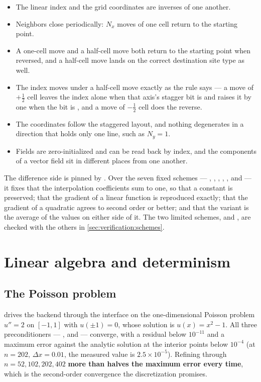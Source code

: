 \begin{itemize}
  \item The linear index and the grid coordinates are inverses of one another.
  \item Neighbors close periodically: $N_x$ moves of one cell return to the
    starting point.
  \item A one-cell move and a half-cell move both return to the starting point
    when reversed, and a half-cell move lands on the correct destination site
    type as well.
  \item The index moves under a half-cell move exactly as the rule says ---
    a move of $+\tfrac12$ cell leaves the index alone when that axis's stagger
    bit is  and raises it by one when the bit is , and a move of
    $-\tfrac12$ cell does the reverse.
  \item The coordinates follow the staggered layout, and nothing degenerates in
    a direction that holds only one line, such as $N_y = 1$.
  \item Fields are zero-initialized and can be read back by index, and the
    components of a vector field sit in different places from one another.
\end{itemize}

The difference side is pinned by . Over the
seven fixed schemes --- , , ,
, ,  and  --- it fixes
that the interpolation coefficients sum to one, so that a constant is
preserved; that the gradient of a linear function is reproduced exactly; that
the gradient of a quadratic agrees to second order or better; and that the
 variant is the average of the  values on either side of
it. The two limited schemes,  and , are checked with the others in \cref{sec:verification:schemes}.

\section{Linear algebra and determinism}
\label{sec:verification:linalg}

\subsection{The Poisson problem}

 drives the  backend through the
 interface on the one-dimensional Poisson problem
$u'' = 2$ on $[-1, 1]$ with $u(\pm1) = 0$, whose solution is
$u(x) = x^{2} - 1$. All three preconditioners --- ,  and
 --- converge, with a residual below $10^{-11}$
and a maximum error against the analytic solution at the interior points below
$10^{-4}$ (at $n = 202$, $\Delta x = 0.01$, the measured value is
$2.5\times10^{-5}$). Refining through $n = 52, 102, 202, 402$ \textbf{more than
halves the maximum error every time}, which is the second-order convergence the
discretization promises.

